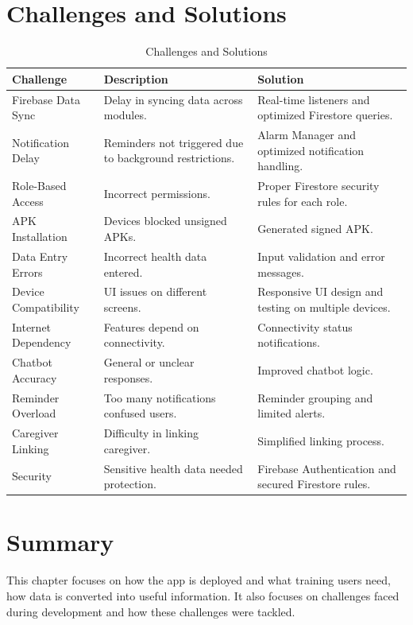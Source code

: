 \documentclass[12pt, a4paper, oneside]{report}
\begin{document}
\section{Challenges and Solutions}

\begin{table}[H]
\centering
\caption{Challenges and Solutions}
\begin{tabularx}{\textwidth}{|l|X|X|}
\hline
\textbf{Challenge} & \textbf{Description} & \textbf{Solution} \\ \hline
Firebase Data Sync & Delay in syncing data across modules. & Real-time listeners and optimized Firestore queries. \\ \hline
Notification Delay & Reminders not triggered due to background restrictions. & Alarm Manager and optimized notification handling. \\ \hline
Role-Based Access & Incorrect permissions. & Proper Firestore security rules for each role. \\ \hline
APK Installation & Devices blocked unsigned APKs. & Generated signed APK. \\ \hline
Data Entry Errors & Incorrect health data entered. & Input validation and error messages. \\ \hline
Device Compatibility & UI issues on different screens. & Responsive UI design and testing on multiple devices. \\ \hline
Internet Dependency & Features depend on connectivity. & Connectivity status notifications. \\ \hline
Chatbot Accuracy & General or unclear responses. & Improved chatbot logic. \\ \hline
Reminder Overload & Too many notifications confused users. & Reminder grouping and limited alerts. \\ \hline
Caregiver Linking & Difficulty in linking caregiver. & Simplified linking process. \\ \hline
Security & Sensitive health data needed protection. & Firebase Authentication and secured Firestore rules. \\ \hline
\end{tabularx}
\end{table}

\section{Summary}

This chapter focuses on how the app is deployed and what training users need, how data is converted into useful information. It also focuses on challenges faced during development and how these challenges were tackled.
\end{document}

